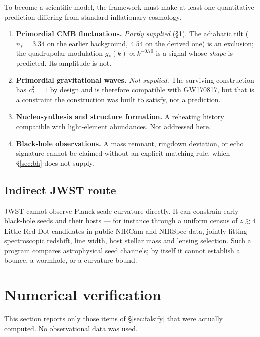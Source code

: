 \documentclass[a4paper,11pt]{article}
\begin{document}
To become a scientific model, the framework must make at least one quantitative prediction differing from standard inflationary cosmology.

\begin{enumerate}
\item \textbf{Primordial CMB fluctuations.} \emph{Partly supplied} (\S\ref{sec:verification}). The adiabatic tilt ($n_s=3.34$ on the earlier background, $4.54$ on the derived one) is an exclusion; the quadrupolar modulation $g_*(k)\propto k^{-0.70}$ is a signal whose \emph{shape} is predicted. Its amplitude is not.
\item \textbf{Primordial gravitational waves.} \emph{Not supplied.} The surviving construction has $c_T^2=1$ by design and is therefore compatible with GW170817, but that is a constraint the construction was built to satisfy, not a prediction.
\item \textbf{Nucleosynthesis and structure formation.} A reheating history compatible with light-element abundances. Not addressed here.
\item \textbf{Black-hole observations.} A mass remnant, ringdown deviation, or echo signature cannot be claimed without an explicit matching rule, which \S\ref{sec:bh} does not supply.
\end{enumerate}

\subsection{Indirect JWST route}

JWST cannot observe Planck-scale curvature directly. It can constrain early black-hole seeds and their hosts --- for instance through a uniform census of $z\gtrsim4$ Little Red Dot candidates in public NIRCam and NIRSpec data, jointly fitting spectroscopic redshift, line width, host stellar mass and lensing selection. Such a program compares astrophysical seed channels; by itself it cannot establish a bounce, a wormhole, or a curvature bound.

\section{Numerical verification}
\label{sec:verification}

This section reports only those items of \S\ref{sec:falsify} that were actually computed. No observational data was used.
\end{document}
